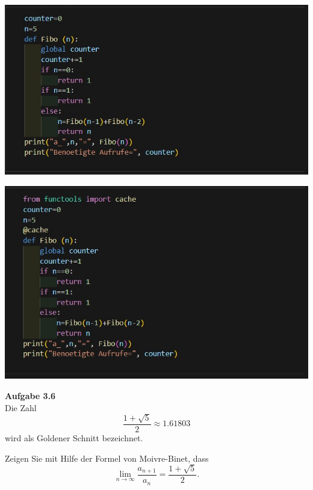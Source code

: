 \documentclass{beamer}
\begin{document}
\begin{frame}
\begin{center}
       \includegraphics[width=1\textwidth]{code/3.5/3.5-01.png}
\end{center}
\end{frame}
\begin{frame}
\begin{center}
       \includegraphics[width=1\textwidth]{code/3.5/3.5-02.png}
\end{center}
\end{frame}
\begin{frame}
\noindent \textbf{Aufgabe 3.6} \\
Die Zahl 
\[
\frac{1 + \sqrt{5}}{2} \approx 1.61803
\]
wird als Goldener Schnitt bezeichnet.

Zeigen Sie mit Hilfe der Formel von Moivre-Binet, dass
\[
\lim_{n \to \infty} \frac{a_{n+1}}{a_n} = \frac{1 + \sqrt{5}}{2}.
\]


\end{frame}
\end{document}
